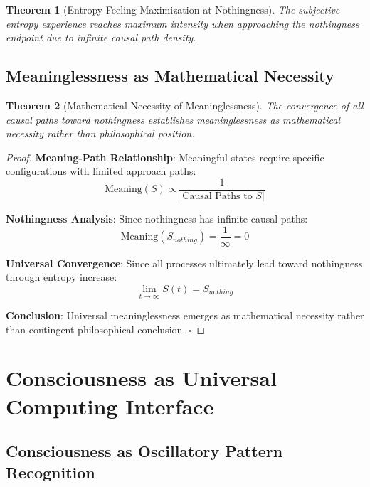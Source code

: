 \documentclass[11pt,a4paper]{article}
\newtheorem{theorem}{Theorem}[section]
\theoremstyle{remark}
\begin{document}
\begin{theorem}[Entropy Feeling Maximization at Nothingness]
The subjective entropy experience reaches maximum intensity when approaching the nothingness endpoint due to infinite causal path density.
\end{theorem}

\subsection{Meaninglessness as Mathematical Necessity}

\begin{theorem}[Mathematical Necessity of Meaninglessness]
The convergence of all causal paths toward nothingness establishes meaninglessness as mathematical necessity rather than philosophical position.
\end{theorem}

\begin{proof}
\textbf{Meaning-Path Relationship}: Meaningful states require specific configurations with limited approach paths:
\begin{equation}
\text{Meaning}(S) \propto \frac{1}{|\text{Causal Paths to } S|}
\end{equation}

\textbf{Nothingness Analysis}: Since nothingness has infinite causal paths:
\begin{equation}
\text{Meaning}(S_{nothing}) = \frac{1}{\infty} = 0
\end{equation}

\textbf{Universal Convergence}: Since all processes ultimately lead toward nothingness through entropy increase:
\begin{equation}
\lim_{t \to \infty} S(t) = S_{nothing}
\end{equation}

\textbf{Conclusion}: Universal meaninglessness emerges as mathematical necessity rather than contingent philosophical conclusion. $\square$
\end{proof}

\section{Consciousness as Universal Computing Interface}

\subsection{Consciousness as Oscillatory Pattern Recognition}
\end{document}
